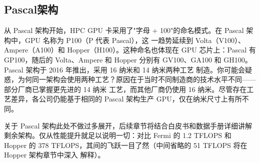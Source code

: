 \subsection{Pascal架构}

从 Pascal 架构开始，HPC GPU 卡采用了"字母 + 100"的命名模式。在 Pascal 架构中，GPU 名称为 P100（P 代表 Pascal），这
一趋势延续到 Volta（V100）、Ampere（A100）和 Hopper（H100）。这种命名也体现在 GPU 芯片上：Pascal 有 GP100，随后的
Volta、Ampere 和 Hopper 分别有 GV100、GA100 和 GH100。Pascal 架构于 2016 年推出，采用 16 纳米和 14 纳米两种工艺
制造。你可能会疑惑，为何同一架构会使用两种工艺？原因在于当时不同制造商的技术水平不同——部分厂商已掌握更先进的 14 纳米
工艺，而其他厂商仍使用 16 纳米。尽管存在工艺差异，各公司仍能基于相同的 Pascal 架构生产 GPU，仅在纳米尺寸上有所不同。

关于 Pascal 架构此处不做过多展开，后续章节将结合白皮书和数据手册详细讲解剩余架构。仅从性能提升就足以说明一切：对比 
Fermi 的 1.2 TFLOPS 和 Hopper 的 378 TFLOPS，其间的飞跃一目了然（中间省略的 51 TFLOPS 将在 Hopper 架构章节中深入
解释）。
